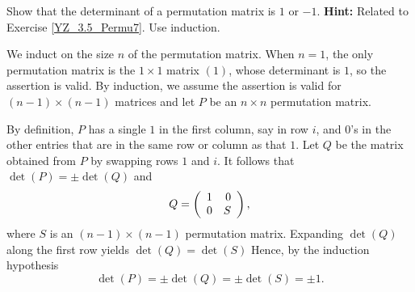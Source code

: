 \documentclass{ximera}
\begin{document}
\begin{exercise} \label{YZ_7.1_permu}
Show that the determinant of a permutation matrix is $1$ or $-1$. {\bf Hint:} Related to Exercise \ref{YZ_3.5_Permu7}. Use induction.

\begin{solution}
\soln
We induct on the size $n$ of the permutation matrix. When $n=1$, the only permutation matrix is the $1\times 1$ matrix $(1)$, whose determinant is $1$, so the assertion is valid. By induction, we assume the assertion is valid for $(n-1)\times (n-1)$ matrices and let $P$ be an $n\times n$ permutation matrix. 

By definition, $P$ has a single $1$ in the first column, say in row $i$,  and $0$'s in the other entries that are in the same row or column as that $1$. Let $Q$ be the matrix obtained from $P$ by swapping rows $1$ and $i$.  It follows that $\det(P) = \pm\det(Q)$ and
\[
Q = \left(\begin{array}{rrrrrrrrrrrrrrrrrr} 1 & 0 \\ 0 & S \end{array}\right),
\]
where $S$ is an $(n-1)\times (n-1)$ permutation matrix. Expanding $\det(Q)$ along the first row yields $\det(Q) = \det(S)$ Hence, by the induction hypothesis 
\[
\det(P) = \pm\det(Q) =\pm\det(S) =\pm 1.
\]
\end{solution}
\end{exercise}
\end{document}
